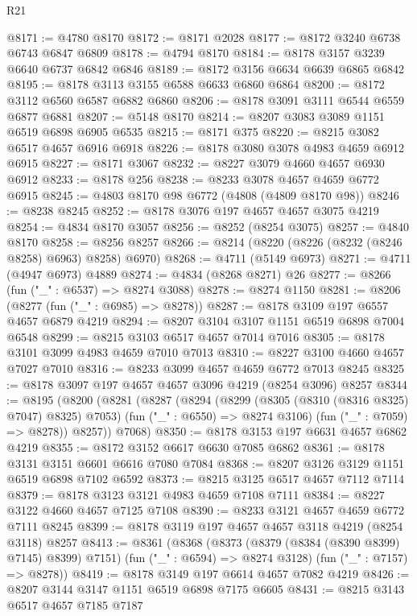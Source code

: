 \begin{lexlean}{R21}
\begin{coremodule}
@8171 := @4780 @8170
@8172 := @8171 @2028
@8177 := @8172 @3240 @6738 @6743 @6847 @6809
@8178 := @4794 @8170
@8184 := @8178 @3157 @3239 @6640 @6737 @6842 @6846
@8189 := @8172 @3156 @6634 @6639 @6865 @6842
@8195 := @8178 @3113 @3155 @6588 @6633 @6860 @6864
@8200 := @8172 @3112 @6560 @6587 @6882 @6860
@8206 := @8178 @3091 @3111 @6544 @6559 @6877 @6881
@8207 := @5148 @8170
@8214 := @8207 @3083 @3089 @1151 @6519 @6898 @6905 @6535
@8215 := @8171 @375
@8220 := @8215 @3082 @6517 @4657 @6916 @6918
@8226 := @8178 @3080 @3078 @4983 @4659 @6912 @6915
@8227 := @8171 @3067
@8232 := @8227 @3079 @4660 @4657 @6930 @6912
@8233 := @8178 @256
@8238 := @8233 @3078 @4657 @4659 @6772 @6915
@8245 := @4803 @8170 @98 @6772 (@4808 (@4809 @8170 @98))
@8246 := @8238 @8245
@8252 := @8178 @3076 @197 @4657 @4657 @3075 @4219
@8254 := @4834 @8170 @3057
@8256 := @8252 (@8254 @3075)
@8257 := @4840 @8170
@8258 := @8256 @8257
@8266 := @8214 (@8220 (@8226 (@8232 (@8246 @8258) @6963) @8258) @6970)
@8268 := @4711 (@5149 @6973)
@8271 := @4711 (@4947 @6973) @4889
@8274 := @4834 (@8268 @8271) @26
@8277 := @8266 (fun ("_" : @6537) => @8274 @3088)
@8278 := @8274 @1150
@8281 := @8206 (@8277 (fun ("_" : @6985) => @8278))
@8287 := @8178 @3109 @197 @6557 @4657 @6879 @4219
@8294 := @8207 @3104 @3107 @1151 @6519 @6898 @7004 @6548
@8299 := @8215 @3103 @6517 @4657 @7014 @7016
@8305 := @8178 @3101 @3099 @4983 @4659 @7010 @7013
@8310 := @8227 @3100 @4660 @4657 @7027 @7010
@8316 := @8233 @3099 @4657 @4659 @6772 @7013 @8245
@8325 := @8178 @3097 @197 @4657 @4657 @3096 @4219 (@8254 @3096) @8257
@8344 := @8195
    (@8200
      (@8281
        (@8287
          (@8294
            (@8299 (@8305 (@8310 (@8316 @8325) @7047) @8325) @7053)
            (fun ("_" : @6550) => @8274 @3106)
            (fun ("_" : @7059) => @8278))
          @8257))
      @7068)
@8350 := @8178 @3153 @197 @6631 @4657 @6862 @4219
@8355 := @8172 @3152 @6617 @6630 @7085 @6862
@8361 := @8178 @3131 @3151 @6601 @6616 @7080 @7084
@8368 := @8207 @3126 @3129 @1151 @6519 @6898 @7102 @6592
@8373 := @8215 @3125 @6517 @4657 @7112 @7114
@8379 := @8178 @3123 @3121 @4983 @4659 @7108 @7111
@8384 := @8227 @3122 @4660 @4657 @7125 @7108
@8390 := @8233 @3121 @4657 @4659 @6772 @7111 @8245
@8399 := @8178 @3119 @197 @4657 @4657 @3118 @4219 (@8254 @3118) @8257
@8413 := @8361
    (@8368
      (@8373 (@8379 (@8384 (@8390 @8399) @7145) @8399) @7151)
      (fun ("_" : @6594) => @8274 @3128)
      (fun ("_" : @7157) => @8278))
@8419 := @8178 @3149 @197 @6614 @4657 @7082 @4219
@8426 := @8207 @3144 @3147 @1151 @6519 @6898 @7175 @6605
@8431 := @8215 @3143 @6517 @4657 @7185 @7187

\end{coremodule}
\end{lexlean}
